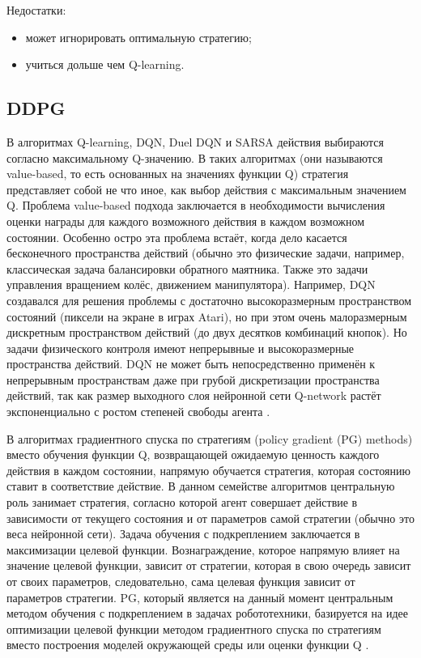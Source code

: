 Недостатки:
\begin{itemize}
	\item может игнорировать оптимальную стратегию;
	\item учиться дольше чем Q-learning.
\end{itemize}

\subsection{DDPG}

В алгоритмах Q-learning, DQN, Duel DQN и SARSA действия выбираются согласно максимальному Q-значению. В таких алгоритмах (они называются value-based, то есть основанных на значениях функции Q) стратегия представляет собой не что иное, как выбор действия с максимальным значением Q. Проблема value-based подхода заключается в необходимости вычисления оценки награды для каждого возможного действия в каждом возможном состоянии. Особенно остро эта проблема встаёт, когда дело касается бесконечного пространства действий (обычно это физические задачи, например, классическая задача балансировки обратного маятника. Также это задачи управления вращением колёс, движением манипулятора). Например, DQN создавался для решения проблемы с достаточно высокоразмерным пространством состояний (пиксели на экране в играх Atari), но при этом очень малоразмерным дискретным пространством действий (до двух десятков комбинаций кнопок). Но задачи физического контроля имеют непрерывные и высокоразмерные пространства действий. DQN не может быть непосредственно применён к непрерывным пространствам даже при грубой дискретизации пространства действий, так как размер выходного слоя нейронной сети Q-network растёт экспоненциально с ростом степеней свободы агента \cite{Nikolenko}.

В алгоритмах градиентного спуска по стратегиям (policy gradient (PG) methods) вместо обучения функции Q, возвращающей ожидаемую ценность каждого действия в каждом состоянии, напрямую обучается стратегия, которая состоянию ставит в соответствие действие. В данном семействе алгоритмов центральную роль занимает стратегия, согласно которой агент совершает действие в зависимости от текущего состояния и от параметров самой стратегии (обычно это веса нейронной сети). Задача обучения с подкреплением заключается в максимизации целевой функции. Вознаграждение, которое напрямую влияет на значение целевой функции, зависит от стратегии, которая в свою очередь зависит от своих параметров, следовательно, сама целевая функция зависит от параметров стратегии. PG, который является на данный момент центральным методом обучения с подкреплением в задачах робототехники, базируется на идее оптимизации целевой функции методом градиентного спуска по стратегиям вместо построения моделей окружающей среды или оценки функции Q \cite{pgms}.

